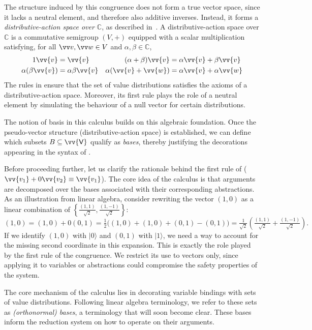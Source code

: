 \documentclass[runningheads,orivec,envcountsame,envcountsect]{llncs}
\newcommand\braces[1]{\left\{#1\right\}}
\newcommand\ket[1]{\ensuremath{|#1\rangle}}
\DeclareRobustCommand{\ValD}{\ensuremath{\vv{\mathsf{V}}}}
\def\C{\mathbb{C}}            %
\begin{document}
The structure induced by this congruence does not form a true vector space,
since it lacks a neutral element, and therefore also additive inverses.
Instead, it forms a \emph{distributive-action space over $\C$}, as described
in~\cite{DiazCaroMalherbe2022}. A distributive-action space over $\C$ is
a commutative semigroup $(V,+)$ equipped with a scalar multiplication
satisfying, for all $\vv v,\vv w\in V$ and $\alpha,\beta\in \C$,
\begin{align*}
  1\vv{v} &= \vv{v} & (\alpha + \beta)\vv{v} &= \alpha\vv{v} + \beta\vv{v}\\
  \alpha(\beta\vv{v}) &= \alpha\beta\vv{v} & \alpha(\vv{v} + \vv{w}) &= \alpha\vv{v} + \alpha\vv{w}
\end{align*}
The rules in  ensure that the set of value distributions
satisfies the axioms of a distributive-action space. Moreover, its first rule
plays the role of a neutral element by simulating the behaviour of a null
vector for certain distributions.

The notion of basis in this calculus builds on this algebraic foundation. Once
the pseudo-vector structure (distributive-action space) is established, we can
define which subsets $B\subseteq \ValD$ qualify as \emph{bases}, thereby
justifying the decorations appearing in the syntax of
.


Before proceeding further, let us clarify the rationale behind the first rule
of  ($\vv{v_1} + 0\vv{v_2}
\equiv \vv{v_1}$). The core idea of the calculus is that arguments are
decomposed over the bases associated with their corresponding abstractions. As
an illustration from linear algebra, consider rewriting the vector $(1,0)$ as a
linear combination of $\braces{\frac{(1,1)}{\sqrt{2}},
\frac{(1,-1)}{\sqrt{2}}}$:
\[
  (1,0) = (1,0) + 0(0,1) 
  = \tfrac{1}{2}\big((1,0) + (1,0) + (0,1) - (0,1)\big)
  = \tfrac{1}{\sqrt{2}}\!\left(\tfrac{(1,1)}{\sqrt{2}} +
  \tfrac{(1,-1)}{\sqrt{2}}\right).
\]
If we identify $(1,0)$ with $\ket{0}$ and $(0,1)$ with $\ket{1}$, we need a way
to account for the missing second coordinate in this expansion. This is exactly
the role played by the first rule of the congruence. We restrict its use to
vectors only, since applying it to variables or abstractions could compromise
the safety properties of the system.

The core mechanism of the calculus lies in decorating variable bindings with
sets of value distributions. Following linear algebra terminology, we refer to
these sets as \emph{(orthonormal) bases}, a terminology that will soon become
clear. These bases inform the reduction system on how to operate on their
arguments.
\end{document}
